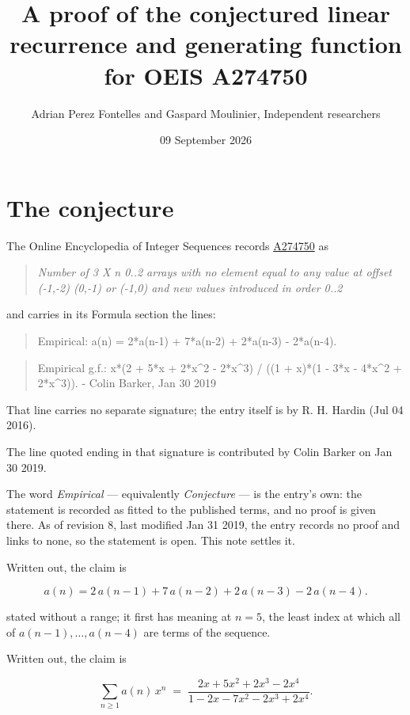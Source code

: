 \documentclass[11pt]{article}
\title{A proof of the conjectured linear recurrence and generating function for OEIS A274750}
\author{Adrian Perez Fontelles and Gaspard Moulinier, Independent researchers}
\date{09 September 2026}
\theoremstyle{definition}
\begin{document}
\maketitle
\section{The conjecture}

The Online Encyclopedia of Integer Sequences records \href{https://oeis.org/A274750}{A274750} as

\begin{quote}\itshape Number of 3 X n 0..2 arrays with no element equal to any value at offset (-1,-2) (0,-1) or (-1,0) and new values introduced in order 0..2\end{quote}

and carries in its Formula section the lines:

\begin{quote}\ttfamily Empirical: a(n) = 2*a(n-1) + 7*a(n-2) + 2*a(n-3) - 2*a(n-4).\end{quote}

\begin{quote}\ttfamily Empirical g.f.: x*(2 + 5*x + 2*x\textasciicircum{}2 - 2*x\textasciicircum{}3) / ((1 + x)*(1 - 3*x - 4*x\textasciicircum{}2 + 2*x\textasciicircum{}3)). - Colin Barker, Jan 30 2019\end{quote}

That line carries no separate signature; the entry itself is by R. H. Hardin (Jul 04 2016).

The line quoted ending in that signature is contributed by Colin Barker on Jan 30 2019.

The word {\itshape Empirical} --- equivalently {\itshape Conjecture} --- is the entry's own: the statement is recorded as fitted to the published terms, and no proof is given there. As of revision 8, last modified Jan 31 2019, the entry records no proof and links to none, so the statement is open. This note settles it.

Written out, the claim is

\[a(n) = 2\,a(n-1) + 7\,a(n-2) + 2\,a(n-3) - 2\,a(n-4).\]

stated without a range; it first has meaning at $n = 5$, the least index at which all of $a(n-1),\dots,a(n-4)$ are terms of the sequence.

Written out, the claim is

\[\sum_{n \ge 1} a(n)\,x^n \;=\; \frac{2x + 5x^{2} + 2x^{3} - 2x^{4}}{1 - 2x - 7x^{2} - 2x^{3} + 2x^{4}}.\]
\end{document}

